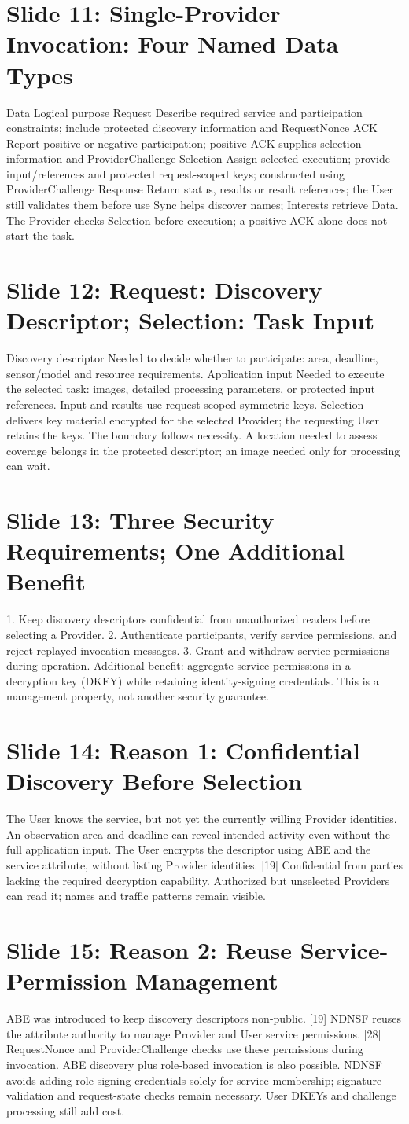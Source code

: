 \documentclass[11pt]{article}
\newcommand{\slideentry}[3]{\section*{Slide #1: #2}#3\par}
\begin{document}
\slideentry{11}{Single-Provider Invocation: Four Named Data Types}{
Data Logical purpose Request Describe required service and participation constraints; include protected discovery information and RequestNonce ACK Report positive or negative participation; positive ACK supplies selection information and ProviderChallenge Selection Assign selected execution; provide input/references and protected request-scoped keys; constructed using ProviderChallenge Response Return status, results or result references; the User still validates them before use Sync helps discover names; Interests retrieve Data. The Provider checks Selection before execution; a positive ACK alone does not start the task.
}
\slideentry{12}{Request: Discovery Descriptor; Selection: Task Input}{
Discovery descriptor Needed to decide whether to participate: area, deadline, sensor/model and resource requirements. Application input Needed to execute the selected task: images, detailed processing parameters, or protected input references. Input and results use request-scoped symmetric keys. Selection delivers key material encrypted for the selected Provider; the requesting User retains the keys. The boundary follows necessity. A location needed to assess coverage belongs in the protected descriptor; an image needed only for processing can wait.
}
\slideentry{13}{Three Security Requirements; One Additional Benefit}{
1. Keep discovery descriptors confidential from unauthorized readers before selecting a Provider. 2. Authenticate participants, verify service permissions, and reject replayed invocation messages. 3. Grant and withdraw service permissions during operation. Additional benefit: aggregate service permissions in a decryption key (DKEY) while retaining identity-signing credentials. This is a management property, not another security guarantee.
}
\slideentry{14}{Reason 1: Confidential Discovery Before Selection}{
The User knows the service, but not yet the currently willing Provider identities. An observation area and deadline can reveal intended activity even without the full application input. The User encrypts the descriptor using ABE and the service attribute, without listing Provider identities. [19] Confidential from parties lacking the required decryption capability. Authorized but unselected Providers can read it; names and traffic patterns remain visible.
}
\slideentry{15}{Reason 2: Reuse Service-Permission Management}{
ABE was introduced to keep discovery descriptors non-public. [19] NDNSF reuses the attribute authority to manage Provider and User service permissions. [28] RequestNonce and ProviderChallenge checks use these permissions during invocation. ABE discovery plus role-based invocation is also possible. NDNSF avoids adding role signing credentials solely for service membership; signature validation and request-state checks remain necessary. User DKEYs and challenge processing still add cost.
}
\end{document}

